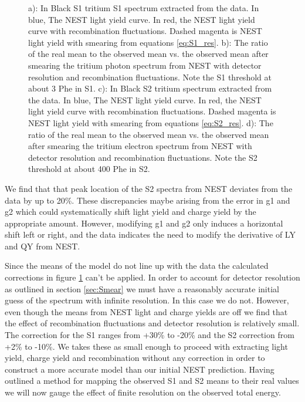 \begin{figure}[h!]
\caption{ a): In Black S1 tritium S1 spectrum extracted from the data. In blue, The NEST light yield curve. In red, the NEST light yield curve with recombination fluctuations. Dashed magenta is NEST light yield with smearing from equations \ref{eq:S1_res}.  b): The ratio of the real mean to the observed mean vs. the observed mean after smearing the tritium photon spectrum from NEST with detector resolution and recombination fluctuations. Note the S1 threshold at about 3 Phe in S1. c): In Black S2 tritium spectrum extracted from the data. In blue, The NEST light yield curve. In red, the NEST light yield curve with recombination fluctuations. Dashed magenta is NEST light yield with smearing from equations \ref{eq:S2_res}.  d): The ratio of the real mean to the observed mean vs. the observed mean after smearing the tritium electron spectrum from NEST with detector resolution and recombination fluctuations. Note the S2 threshold at about 400 Phe in S2. }

\label{fig:S1S2_mapping}
\end{figure}
\renewcommand{\baselinestretch}{2}
\small\normalsize


We find that that peak location of the S2 spectra from NEST deviates from the data by up to 20\%. These discrepancies maybe arising from the error  in g1 and g2 which could systematically shift light yield and charge yield by the appropriate amount. However, modifying g1 and g2 only induces a horizontal shift left or right, and the data indicates the need to modify the derivative of LY and QY from NEST.

 
Since the means of the model do not line up with the data the calculated corrections in figure \ref{fig:S1S2_mapping} can't be applied. In order to account for detector resolution as outlined in section \ref{sec:Smear} we must have a reasonably accurate initial guess of the spectrum with infinite resolution. In this case we do not. However, even though the means from NEST light and charge yields are off we find that the effect of recombination fluctuations and detector resolution is relatively small. The correction for the S1 ranges from +30\% to -20\% and the S2 correction from +2\% to -10\%. We takes these as small enough to proceed with extracting light yield, charge yield and recombination without any correction in order to construct a more accurate model than our initial NEST prediction. Having outlined a method for mapping the observed S1 and S2 means to their real values we will now gauge the effect of finite resolution on the observed total energy.  %



